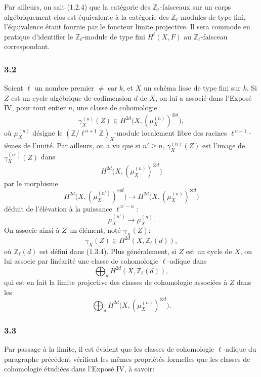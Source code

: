 \documentclass[11pt]{article}
\newcommand{\car}{\operatorname{car}}
\providecommand{\car}{\operatorname{car}}
\providecommand{\car}{\operatorname{car}}
\begin{document}
Par ailleurs, on sait (1.2.4) que la catégorie des \(\mathbb Z_\ell\)-faisceaux sur un corps algébriquement clos est équivalente à la catégorie des \(\mathbb Z_\ell\)-modules de type fini, l'équivalence étant fournie par le foncteur limite projective. Il sera commode en pratique d'identifier le \(\mathbb Z_\ell\)-module de type fini \(H^i(X,F)\) au \(\mathbb Z_\ell\)-faisceau correspondant.

\subsubsection*{3.2}
Soient \(\ell\) un nombre premier \(\ne\car k\), et \(X\) un schéma lisse de type fini sur \(k\). Si \(Z\) est un cycle algébrique de codimension \(d\) de \(X\), on lui a associé dans l'Exposé IV, pour tout entier \(n\), une classe de cohomologie
\[
\gamma_X^{(n)}(Z)\in H^{2d}\bigl(X,(\mu_X^{(n)})^{\otimes d}\bigr),
\]
où \(\mu_X^{(n)}\) désigne le \((\mathbb Z/\ell^{\,n+1}\mathbb Z)_X\)-module localement libre des racines \(\ell^{\,n+1}\)-ièmes de l'unité. Par ailleurs, on a vu que si \(n'\ge n\), \(\gamma_X^{(n)}(Z)\) est l'image de \(\gamma_X^{(n')}(Z)\) dans
\[
H^{2d}\bigl(X,(\mu_X^{(n)})^{\otimes d}\bigr)
\]
par le morphisme
\[
H^{2d}\bigl(X,(\mu_X^{(n')})^{\otimes d}\bigr)
\longrightarrow
H^{2d}\bigl(X,(\mu_X^{(n)})^{\otimes d}\bigr)
\]
déduit de l'élévation à la puissance \(\ell^{\,n'-n}\):
\[
\mu_X^{(n')}\longrightarrow \mu_X^{(n)}.
\]
On associe ainsi à \(Z\) un élément, noté \(\gamma_X(Z)\):
\[
\gamma_X(Z)\in H^{2d}(X,\mathbb Z_\ell(d)),
\]
où \(\mathbb Z_\ell(d)\) est défini dans (1.3.4). Plus généralement, si \(Z\) est un cycle de \(X\), on lui associe par linéarité une classe de cohomologie \(\ell\)-adique dans
\[
\bigoplus_d H^{2d}(X,\mathbb Z_\ell(d)),
\]
qui est en fait la limite projective des classes de cohomologie associées à \(Z\) dans les
\[
\bigoplus_d H^{2d}\bigl(X,(\mu_X^{(n)})^{\otimes d}\bigr).
\]

\subsubsection*{3.3}
Par passage à la limite, il est évident que les classes de cohomologie \(\ell\)-adique du paragraphe précédent vérifient les mêmes propriétés formelles que les classes de cohomologie étudiées dans l'Exposé IV, à savoir:
\end{document}
